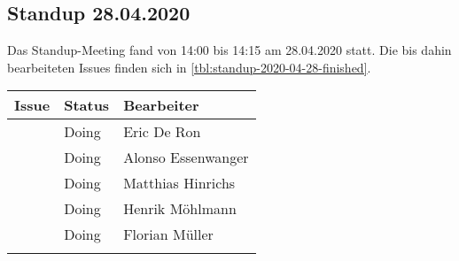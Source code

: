 	\subsection{Standup 28.04.2020}
	Das Standup-Meeting fand von 14:00 bis 14:15 am 28.04.2020 statt. Die bis dahin bearbeiteten Issues finden sich in \autoref{tbl:standup-2020-04-28-finished}.
		\begin{tabularx}{0.75\textwidth}{c|X|X}
			Issue 			& Status 	& Bearbeiter			\\
			\hline
			\issueref{37}	& Doing		& Eric De Ron			\\
			\issueref{34}	& Doing		& Alonso Essenwanger	\\
			\issueref{32}	& Doing		& Matthias Hinrichs		\\
			\issueref{36}	& Doing		& Henrik Möhlmann		\\
			\issueref{24}	& Doing		& Florian Müller		\\
			\hline
			\caption{bearbeitete Issues}
			\label{tbl:standup-2020-04-28-finished}
		\end{tabularx}
